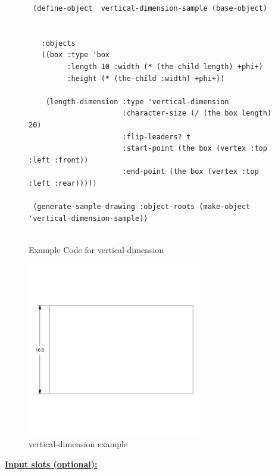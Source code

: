 \documentclass [11pt]{book}
\begin{document}
\begin{itemize}
\begin{figure}
\begin{lrbox}{\boxedverb}
\begin{minipage}{\linewidth}
{\begin{verbatim}
 (define-object  vertical-dimension-sample (base-object)
  
  
   :objects
   ((box :type 'box
         :length 10 :width (* (the-child length) +phi+)
         :height (* (the-child :width) +phi+))
   
    (length-dimension :type 'vertical-dimension
                      :character-size (/ (the box length) 20)
                      :flip-leaders? t
                      :start-point (the box (vertex :top :left :front))
                      :end-point (the box (vertex :top :left :rear)))))

 (generate-sample-drawing :object-roots (make-object 'vertical-dimension-sample))


\end{verbatim}}
\end{minipage}
\end{lrbox}
\fbox{\usebox{\boxedverb}}

\caption{Example Code for vertical-dimension}

\label{fig:example-code-vertical-dimension}

\end{figure}

\begin{figure}
\begin{center}
\includegraphics[width=3in,height=3in]{../images/example-vertical-dimension.pdf}
\end{center}

\caption{vertical-dimension example}

\label{fig:vertical-dimension}

\end{figure}





\textbf{
\underline{Input slots (optional):}}


\end{itemize}
\end{document}
